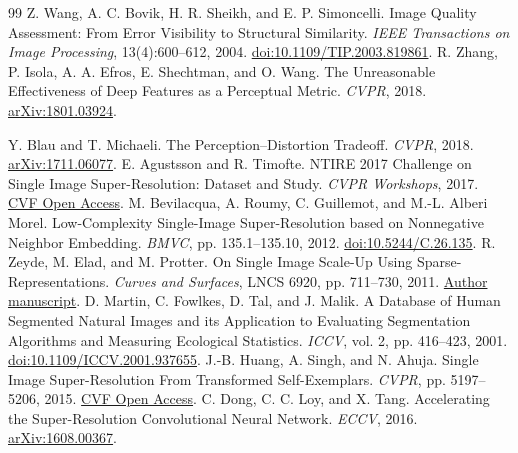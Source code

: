\documentclass[10pt,twocolumn,letterpaper]{article}
\begin{document}
\begin{thebibliography}{99}
Z. Wang, A. C. Bovik, H. R. Sheikh, and E. P. Simoncelli.
Image Quality Assessment: From Error Visibility to Structural Similarity.
\emph{IEEE Transactions on Image Processing}, 13(4):600--612, 2004.
\href{https://doi.org/10.1109/TIP.2003.819861}{doi:10.1109/TIP.2003.819861}.
R. Zhang, P. Isola, A. A. Efros, E. Shechtman, and O. Wang.
The Unreasonable Effectiveness of Deep Features as a Perceptual Metric.
\emph{CVPR}, 2018.
\href{https://arxiv.org/abs/1801.03924}{arXiv:1801.03924}.

Y. Blau and T. Michaeli.
The Perception--Distortion Tradeoff.
\emph{CVPR}, 2018.
\href{https://arxiv.org/abs/1711.06077}{arXiv:1711.06077}.
E. Agustsson and R. Timofte.
NTIRE 2017 Challenge on Single Image Super-Resolution: Dataset and Study.
\emph{CVPR Workshops}, 2017.
\href{https://openaccess.thecvf.com/content_cvpr_2017_workshops/w12/papers/Agustsson_NTIRE_2017_Challenge_CVPR_2017_paper.pdf}{CVF Open Access}.
M. Bevilacqua, A. Roumy, C. Guillemot, and M.-L. Alberi Morel.
Low-Complexity Single-Image Super-Resolution based on Nonnegative Neighbor Embedding.
\emph{BMVC}, pp. 135.1--135.10, 2012.
\href{https://doi.org/10.5244/C.26.135}{doi:10.5244/C.26.135}.
R. Zeyde, M. Elad, and M. Protter.
On Single Image Scale-Up Using Sparse-Representations.
\emph{Curves and Surfaces}, LNCS 6920, pp. 711--730, 2011.
\href{https://elad.cs.technion.ac.il/wp-content/uploads/2018/02/ImageScaleUp_LNCS.pdf}{Author manuscript}.
D. Martin, C. Fowlkes, D. Tal, and J. Malik.
A Database of Human Segmented Natural Images and its Application to Evaluating Segmentation Algorithms and Measuring Ecological Statistics.
\emph{ICCV}, vol. 2, pp. 416--423, 2001.
\href{https://doi.org/10.1109/ICCV.2001.937655}{doi:10.1109/ICCV.2001.937655}.
J.-B. Huang, A. Singh, and N. Ahuja.
Single Image Super-Resolution From Transformed Self-Exemplars.
\emph{CVPR}, pp. 5197--5206, 2015.
\href{https://openaccess.thecvf.com/content_cvpr_2015/html/Huang_Single_Image_Super-Resolution_2015_CVPR_paper.html}{CVF Open Access}.
C. Dong, C. C. Loy, and X. Tang.
Accelerating the Super-Resolution Convolutional Neural Network.
\emph{ECCV}, 2016.
\href{https://arxiv.org/abs/1608.00367}{arXiv:1608.00367}.
\end{thebibliography}
\end{document}
